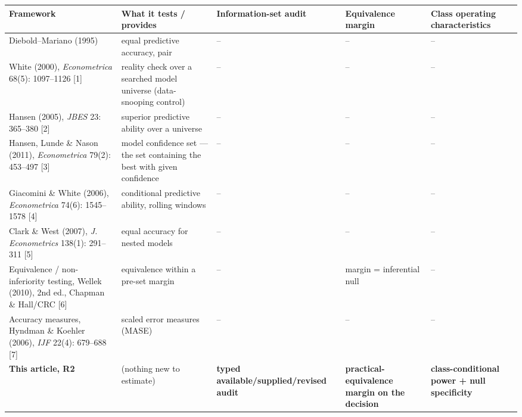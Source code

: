 \documentclass[11pt]{article}
\begin{document}
{\def\LTcaptype{none} %
\begin{longtable}[]{@{}
  >{\raggedright\arraybackslash}p{}
  >{\raggedright\arraybackslash}p{}
  >{\raggedright\arraybackslash}p{}
  >{\raggedright\arraybackslash}p{}
  >{\raggedright\arraybackslash}p{}@{}}
\toprule\noalign{}
\begin{minipage}[b]{\linewidth}\raggedright
Framework
\end{minipage} & \begin{minipage}[b]{\linewidth}\raggedright
What it tests / provides
\end{minipage} & \begin{minipage}[b]{\linewidth}\raggedright
Information-set audit
\end{minipage} & \begin{minipage}[b]{\linewidth}\raggedright
Equivalence margin
\end{minipage} & \begin{minipage}[b]{\linewidth}\raggedright
Class operating characteristics
\end{minipage} \\
\midrule\noalign{}
\endhead
\bottomrule\noalign{}
\endlastfoot
Diebold--Mariano (1995) & equal predictive accuracy, pair & -- & -- &
-- \\
White (2000), \emph{Econometrica} 68(5): 1097--1126 {[}1{]} & reality
check over a searched model universe (data-snooping control) & -- & -- &
-- \\
Hansen (2005), \emph{JBES} 23: 365--380 {[}2{]} & superior predictive
ability over a universe & -- & -- & -- \\
Hansen, Lunde \& Nason (2011), \emph{Econometrica} 79(2): 453--497
{[}3{]} & model confidence set --- the set containing the best with
given confidence & -- & -- & -- \\
Giacomini \& White (2006), \emph{Econometrica} 74(6): 1545--1578 {[}4{]}
& conditional predictive ability, rolling windows & -- & -- & -- \\
Clark \& West (2007), \emph{J. Econometrics} 138(1): 291--311 {[}5{]} &
equal accuracy for nested models & -- & -- & -- \\
Equivalence / non-inferiority testing, Wellek (2010), 2nd ed., Chapman
\& Hall/CRC {[}6{]} & equivalence within a pre-set margin & -- & margin
= inferential null & -- \\
Accuracy measures, Hyndman \& Koehler (2006), \emph{IJF} 22(4): 679--688
{[}7{]} & scaled error measures (MASE) & -- & -- & -- \\
\textbf{This article, R2} & (nothing new to estimate) & \textbf{typed
available/supplied/revised audit} & \textbf{practical-equivalence margin
on the decision} & \textbf{class-conditional power + null
specificity} \\
\end{longtable}
}
\end{document}
